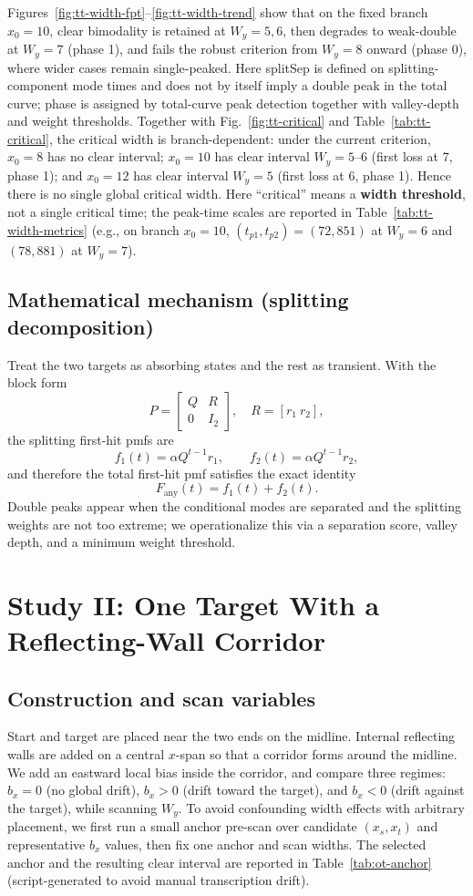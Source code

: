 \documentclass[11pt]{article}
\begin{document}
Figures~\ref{fig:tt-width-fpt}--\ref{fig:tt-width-trend} show that on the fixed branch $x_0=10$, clear bimodality is retained at $W_y=5,6$, then degrades to weak-double at $W_y=7$ (phase 1), and fails the robust criterion from $W_y=8$ onward (phase 0), where wider cases remain single-peaked.
Here splitSep is defined on splitting-component mode times and does not by itself imply a double peak in the total curve; phase is assigned by total-curve peak detection together with valley-depth and weight thresholds.
Together with Fig.~\ref{fig:tt-critical} and Table~\ref{tab:tt-critical}, the critical width is branch-dependent: under the current criterion, $x_0=8$ has no clear interval; $x_0=10$ has clear interval $W_y=5\text{--}6$ (first loss at 7, phase 1); and $x_0=12$ has clear interval $W_y=5$ (first loss at 6, phase 1). Hence there is no single global critical width.
Here “critical” means a \textbf{width threshold}, not a single critical time; the peak-time scales are reported in Table~\ref{tab:tt-width-metrics} (e.g., on branch $x_0=10$, $(t_{p1},t_{p2})=(72,851)$ at $W_y=6$ and $(78,881)$ at $W_y=7$).

\subsection{Mathematical mechanism (splitting decomposition)}
Treat the two targets as absorbing states and the rest as transient. With the block form
\[
P=\begin{bmatrix}Q & R\\0&I_2\end{bmatrix},\quad R=[r_1\ r_2],
\]
the splitting first-hit pmfs are
\[
f_1(t)=\alpha Q^{t-1}r_1,\qquad
f_2(t)=\alpha Q^{t-1}r_2,
\]
and therefore the total first-hit pmf satisfies the exact identity
\[
F_{\mathrm{any}}(t)=f_1(t)+f_2(t).
\]
Double peaks appear when the conditional modes are separated and the splitting weights are not too extreme; we operationalize this via a separation score, valley depth, and a minimum weight threshold.

\section{Study II: One Target With a Reflecting-Wall Corridor}
\subsection{Construction and scan variables}
Start and target are placed near the two ends on the midline. Internal reflecting walls are added on a central $x$-span so that a corridor forms around the midline. We add an eastward local bias inside the corridor, and compare three regimes: $b_x=0$ (no global drift), $b_x>0$ (drift toward the target), and $b_x<0$ (drift against the target), while scanning $W_y$.
To avoid confounding width effects with arbitrary placement, we first run a small anchor pre-scan over candidate $(x_s,x_t)$ and representative $b_x$ values, then fix one anchor and scan widths.
The selected anchor and the resulting clear interval are reported in Table~\ref{tab:ot-anchor} (script-generated to avoid manual transcription drift).
\end{document}
